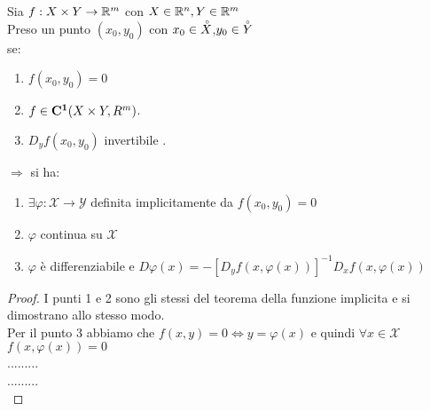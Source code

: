 \proposition
Sia $f:X\times Y\rightarrow \mathbb{R}^m$ con $X\in \mathbb{R}^n, Y\in \mathbb{R}^m$\\
Preso un punto $(x_0,y_0)$ con $x_0\in \accentset{\circ}{X}$,$y_0\in \accentset{\circ}{Y}$\\
se:
\begin{enumerate}
	\item $f(x_0,y_0)=0$
	\item $f\in \mathbf{C^{1}}(X\times Y,R^m)$.
	\item $D_yf(x_0,y_0)$ invertibile .
\end{enumerate}
$\Rightarrow $ si ha:\\
\begin{enumerate}
	\item $\exists \varphi: \mathcal{X}\rightarrow\mathcal{Y}$ definita implicitamente da $f(x_0,y_0)=0$
	\item $\varphi$ continua su $\mathcal{X}$
	\item $\varphi$ è differenziabile e $D\varphi(x)=-[D_yf(x,\varphi(x))]^{-1}D_xf(x,\varphi(x))$
\end{enumerate}
\begin{proof}
	I punti 1 e 2 sono gli stessi del teorema della funzione implicita e si dimostrano allo stesso modo.\\
	Per il punto 3 abbiamo che $f(x,y)=0\Leftrightarrow y=\varphi(x)$ e quindi $\forall x\in \mathcal{X}$ $f(x,\varphi(x))=0$\\
	.........\\
	.........\\
	
\end{proof}

